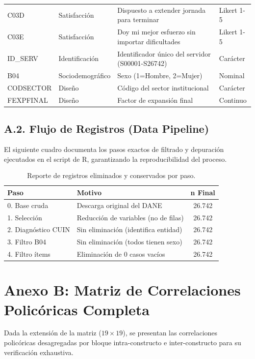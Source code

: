 \documentclass[11pt, a4paper]{article} %
\begin{document}
\begin{table}[H]
\begin{tabularx}{\textwidth}{l l X l}
C03D & Satisfacción & Dispuesto a extender jornada para terminar & Likert 1-5 \\
C03E & Satisfacción & Doy mi mejor esfuerzo sin importar dificultades & Likert 1-5 \\
\midrule
ID\_SERV & Identificación & Identificador único del servidor (S00001-S26742) & Carácter \\
B04 & Sociodemográfico & Sexo (1=Hombre, 2=Mujer) & Nominal \\
CODSECTOR & Diseño & Código del sector institucional & Carácter \\
FEXPFINAL & Diseño & Factor de expansión final & Continuo \\
\bottomrule
\end{tabularx}
\end{table}

\subsection*{A.2. Flujo de Registros (Data Pipeline)}
El siguiente cuadro documenta los pasos exactos de filtrado y depuración ejecutados en el script de R, garantizando la reproducibilidad del proceso.

\begin{table}[H]
\centering
\footnotesize
\caption{Reporte de registros eliminados y conservados por paso.}
\begin{tabularx}{\textwidth}{l X c}
\toprule
\textbf{Paso} & \textbf{Motivo} & \textbf{n Final} \\
\midrule
0. Base cruda & Descarga original del DANE & 26.742 \\
1. Selección & Reducción de variables (no de filas) & 26.742 \\
2. Diagnóstico CUIN & Sin eliminación (identifica entidad) & 26.742 \\
3. Filtro B04 & Sin eliminación (todos tienen sexo) & 26.742 \\
4. Filtro ítems & Eliminación de 0 casos vacíos & 26.742 \\
\bottomrule
\end{tabularx}
\end{table}

\section{Anexo B: Matriz de Correlaciones Policóricas Completa}

Dada la extensión de la matriz ($19 \times 19$), se presentan las correlaciones policóricas desagregadas por bloque intra-constructo e inter-constructo para su verificación exhaustiva.
\end{document}
